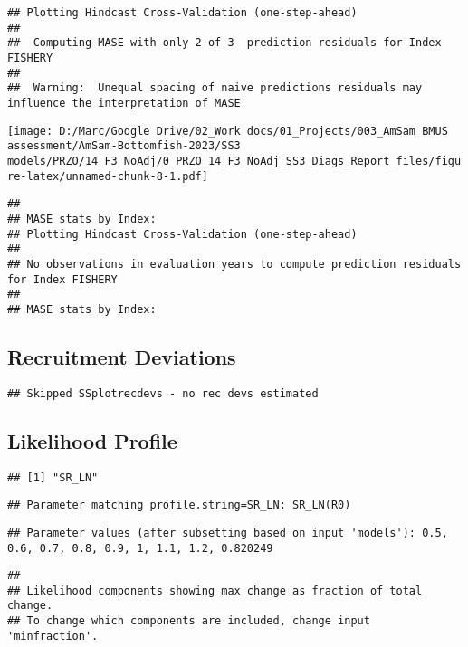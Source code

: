 \documentclass[
]{article}
\begin{document}
\begin{verbatim}
## Plotting Hindcast Cross-Validation (one-step-ahead) 
## 
##  Computing MASE with only 2 of 3  prediction residuals for Index FISHERY 
## 
##  Warning:  Unequal spacing of naive predictions residuals may influence the interpretation of MASE
\end{verbatim}

\texttt{[image: D:/Marc/Google Drive/02\_Work docs/01\_Projects/003\_AmSam BMUS assessment/AmSam-Bottomfish-2023/SS3 models/PRZO/14\_F3\_NoAdj/0\_PRZO\_14\_F3\_NoAdj\_SS3\_Diags\_Report\_files/figure-latex/unnamed-chunk-8-1.pdf]}

\begin{verbatim}
## 
## MASE stats by Index:
## Plotting Hindcast Cross-Validation (one-step-ahead) 
## 
## No observations in evaluation years to compute prediction residuals for Index FISHERY 
## 
## MASE stats by Index:
\end{verbatim}

\hypertarget{recruitment-deviations}{%
\subsection{Recruitment Deviations}\label{recruitment-deviations}}

\begin{verbatim}
## Skipped SSplotrecdevs - no rec devs estimated
\end{verbatim}

\hypertarget{likelihood-profile}{%
\subsection{Likelihood Profile}\label{likelihood-profile}}

\begin{verbatim}
## [1] "SR_LN"
\end{verbatim}

\begin{verbatim}
## Parameter matching profile.string=SR_LN: SR_LN(R0)
\end{verbatim}

\begin{verbatim}
## Parameter values (after subsetting based on input 'models'): 0.5, 0.6, 0.7, 0.8, 0.9, 1, 1.1, 1.2, 0.820249
\end{verbatim}

\begin{verbatim}
## 
## Likelihood components showing max change as fraction of total change.
## To change which components are included, change input 'minfraction'.
\end{verbatim}
\end{document}
